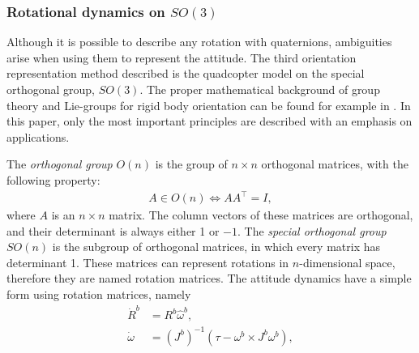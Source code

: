 \subsubsection{Rotational dynamics on $SO(3)$}
Although it is possible to describe any rotation with quaternions, ambiguities arise when using them to represent the attitude. The third orientation representation method described is the quadcopter model on the special orthogonal group, $SO(3)$. The proper mathematical background of group theory and Lie-groups for rigid body orientation can be found for example in \cite{isidori1995nonlinear,Leethesis}. In this paper, only the most important principles are described with an emphasis on applications.

The\textit{ orthogonal group }$O(n)$ is the group of $n\times n$ orthogonal matrices, with the following property: 
\begin{align}
    A\in O(n) \Leftrightarrow AA^\top=I,
\end{align}
where $A$ is an $n\times n$ matrix. The column vectors of these matrices are orthogonal, and their determinant is always either 1 or $-1$. The\textit{ special orthogonal group} $SO(n)$ is the subgroup of orthogonal matrices, in which every matrix has determinant 1. These matrices can represent rotations in $n$-dimensional space, therefore they are named rotation matrices.
The attitude dynamics have a simple form using rotation matrices, namely
\begin{subequations}\label{eq:rot12}
   \begin{align}
    \dot{R}^b & = R^b\hat{\omega}^b,\label{eq:rot1}\\
    \dot{\omega} & = \left(J^b\right)^{-1}\left(\tau - \omega^b\times J^b \omega^b\right),\label{eq:rot2}
\end{align} 
\end{subequations}

